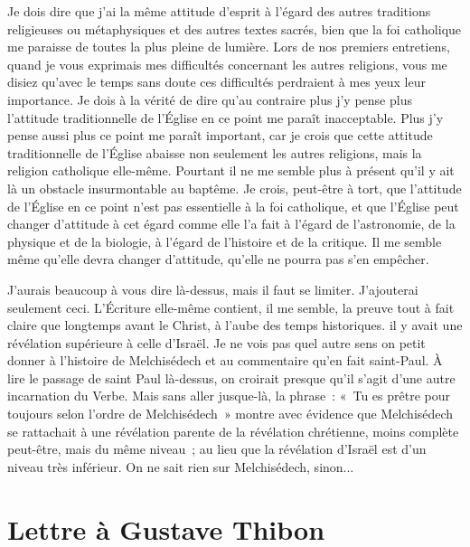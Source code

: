 \documentclass[french,twoside]{book} %
\newcommand\chapteropen{} %
\newcommand\chaptercont{} %
\newcommand\chapterclose{} %
\begin{document}
Je dois dire que j'ai la même attitude d'esprit à l'égard des autres traditions religieuses ou métaphysiques et des autres textes sacrés, bien que la foi catholique me paraisse de toutes la plus pleine de lumière. Lors de nos premiers entretiens, quand je vous exprimais mes difficultés concernant les autres religions, vous me disiez qu'avec le temps sans doute ces difficultés perdraient à mes yeux leur importance. Je dois à la vérité de dire qu'au contraire plus j'y pense plus l'attitude traditionnelle de l'Église en ce point me paraît inacceptable. Plus j'y pense aussi plus ce point me paraît important, car je crois que cette attitude traditionnelle de l'Église abaisse non seulement les autres religions, mais la religion catholique elle-même. Pourtant il ne me semble plus à présent qu'il y ait là un obstacle insurmontable au baptême. Je crois, peut-être à tort, que l'attitude de l'Église en ce point n'est pas essentielle à la foi catholique, et que l'Église peut changer d'attitude à cet égard comme elle l'a fait à l'égard de l'astronomie, de la physique et de la biologie, à l'égard de l'histoire et de la critique. Il me semble même qu'elle devra changer d'attitude, qu'elle ne pourra pas s'en empêcher.\par
J'aurais beaucoup à vous dire là-dessus, mais il faut se limiter. J'ajouterai seulement ceci. L'Écriture elle-même contient, il me semble, la preuve tout à fait claire que longtemps avant le Christ, à l'aube des temps historiques. il y avait une révélation supérieure à celle d'Israël. Je ne vois pas quel autre sens on petit donner à l'histoire de Melchisédech et au commentaire qu'en fait saint-Paul. À lire le passage de saint Paul là-dessus, on croirait presque qu'il s'agit d'une autre incarnation du Verbe. Mais sans aller jusque-là, la phrase : « Tu es prêtre pour toujours selon l'ordre de Melchisédech » montre avec évidence que Melchisédech se rattachait à une révélation parente de la révélation chrétienne, moins complète peut-être, mais du même niveau ; au lieu que la révélation d'Israël est d'un niveau très inférieur. On ne sait rien sur Melchisédech, sinon...
\chapterclose


\chapteropen
\chapter[Lettre à Gustave Thibon]{Lettre à Gustave Thibon}

\chaptercont
\end{document}
